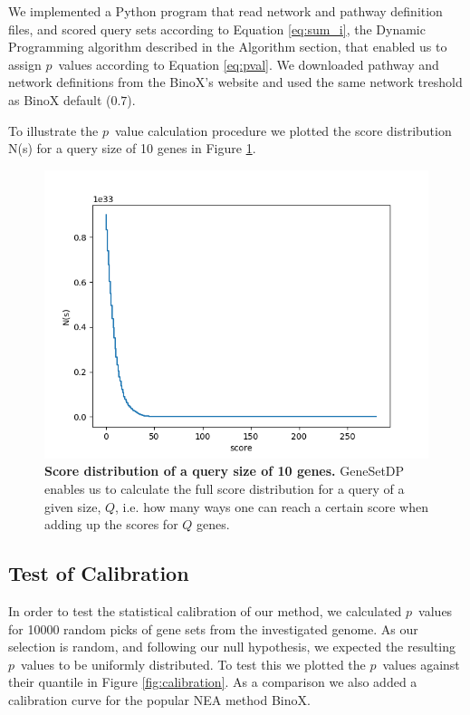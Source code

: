 \documentclass[a4paper,american]{lipics-v2016}
\begin{document}
We implemented a Python program that read network and pathway definition files, and scored query sets according to Equation \ref{eq:sum_i}, the Dynamic Programming algorithm described in the Algorithm section, that enabled us to assign $p$~values according to Equation \ref{eq:pval}. We downloaded pathway and network definitions from the BinoX's website and used the same network treshold as BinoX default ($0.7$).

To illustrate the $p$~value calculation procedure we plotted the score distribution N(s) for a query size of 10 genes in Figure \ref{fig:score_dist}.

\begin{figure}[htb]
		\begin{center}
				\includegraphics[scale=0.8]{figures/F1_score_distribuition.png}
		\end{center}
  \caption{{\bf Score distribution of a query size of 10 genes.} GeneSetDP enables us to calculate the full score distribution for a query of a given size, $Q$, i.e. how many ways one can reach a certain score when adding up the scores for $Q$ genes.}
  \label{fig:score_dist}
\end{figure}

\subsection*{Test of Calibration}

In order to test the statistical calibration of our method, we calculated $p$~values for 10000 random picks of gene sets from the investigated genome. As our selection is random, and following our null hypothesis, we expected the resulting $p$~values to be uniformly distributed. To test this we plotted the $p$~values against their quantile in Figure \ref{fig:calibration}. As a comparison we also added a calibration curve for the popular NEA method BinoX\cite{ogris2016novel}.
\end{document}

